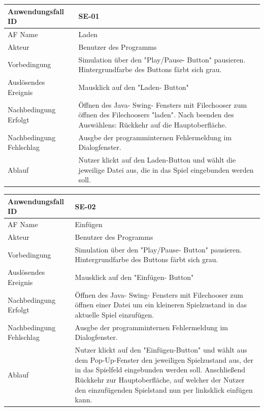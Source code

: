 \documentclass[11pt,a4paper]{article}
\begin{document}
    
    \begin{tabular}[m]{|m{7cm}|m{9cm}|}
        \hline
        Anwendungsfall ID     & SE-01 \\ %
        \hline
        AF Name     &  Laden \\
        \hline
        Akteur &  Benutzer des Programms \\
        \hline
        Vorbedingung & Simulation über den "Play/Pause- Button" pausieren. Hintergrundfarbe des Buttons färbt sich grau.\\
        \hline
        Auslösendes Ereignis & Mausklick auf den "Laden- Button"\\
        \hline
        Nachbedingung Erfolgt & Öffnen des Java- Swing- Fensters mit Filechooser zum öffnen des Filechoosers "laden". Nach beenden des Auswählens: Rückkehr auf die Hauptoberfläche.\\
        \hline
        Nachbedingung Fehlschlag & Ausgbe der programminternen Fehlermeldung im Dialogfenster.\\
        \hline
        Ablauf & Nutzer klickt auf den Laden-Button und wählt die jeweilige Datei aus, die in das Spiel eingebunden werden soll.\\
        \hline
    \end{tabular}
    \par
    
    
        \begin{tabular}[m]{|m{7cm}|m{9cm}|}
        \hline
        Anwendungsfall ID     & SE-02 \\ %
        \hline
        AF Name     &  Einfügen \\
        \hline
        Akteur&Benutzer des Programms \\
        \hline
        Vorbedingung & Simulation über den "Play/Pause- Button" pausieren. Hintergrundfarbe des Buttons färbt sich grau.\\
        \hline
        Auslösendes Ereignis & Mausklick auf den "Einfügen- Button"\\
        \hline
        Nachbedingung Erfolgt& Öffnen des Java- Swing- Fensters mit Filechooser zum öffnen einer Datei um ein kleineren Spielzustand in das aktuelle Spiel einzufügen.\\
        \hline
        Nachbedingung Fehlschlag&Ausgbe der programminternen Fehlermeldung im Dialogfenster.\\
        \hline
        Ablauf&Nutzer klickt auf den "Einfügen-Button" und wählt aus dem Pop-Up-Fenster den jeweiligen Spielzustand aus, der in das Spielfeld eingebunden werden soll. Anschließend Rückkehr zur Hauptoberfläche, auf welcher der Nutzer den einzufügenden Spielstand nun per linksklick einfügen kann.\\
        \hline
    \end{tabular}
    \par
    
\end{document}
